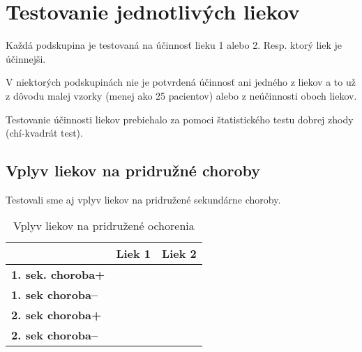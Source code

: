 \section{Testovanie jednotlivých liekov}

Každá podskupina je testovaná na účinnosť lieku 1 alebo 2. Resp. ktorý liek je účinnejši.

V niektorých podskupinách nie je potvrdená účinnosť ani jedného z liekov a to už z dôvodu malej vzorky (menej ako 25 pacientov) alebo z neúčinnosti oboch liekov.

Testovanie účinnosti liekov prebiehalo za pomoci štatistického testu dobrej zhody (chí-kvadrát test).



\subsection{Vplyv liekov na pridružné choroby}

Testovali sme aj vplyv liekov na pridružené sekundárne choroby.

\begin{table}[h!]
\centering
\begin{tabular}{l|ll}
\hline
                          & \textbf{Liek 1} & \textbf{Liek 2} \\ \hline
\textbf{1. sek. choroba+} &                 &                 \\ \hline
\textbf{1. sek choroba--} &                 &                 \\ \hline
\textbf{2. sek choroba+}  &                 &                 \\ \hline
\textbf{2. sek choroba--} &                 &                 \\ \hline
\end{tabular}
\caption{Vplyv liekov na pridružené ochorenia}
\label{tab:sekundarne-ochorenia}
\end{table}